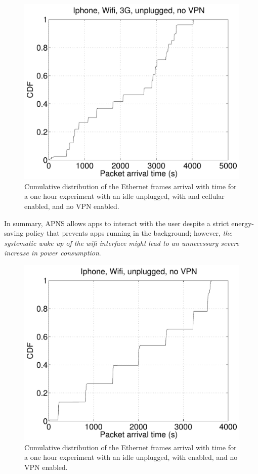 \begin{figure}
\centering
        \includegraphics[width=0.8\linewidth]{../../code/pushNotification/Fig/bw_iphone_wifi_3g_unplug_novpn_ts.pdf}
  \caption{Cumulative distribution of the Ethernet frames
          arrival with time for a one hour experiment with an idle
          \iphone{} unplugged, with \wifi{} and cellular enabled, and no VPN
          enabled.}
  \label{fig:push_w3_ts}
   \vspace{\postfigspace}
\end{figure}


In summary, APNS allows apps to interact with the user despite a strict energy-saving policy that 
prevents apps running in the background; however, \emph{the systematic wake up of
the wifi interface might lead to an unnecessary severe increase in power
consumption}. 


\begin{figure}
\centering
        \includegraphics[width=0.8\linewidth]{../../code/pushNotification/Fig/bw_iphone_wifi_unplug_novpn_ts.pdf}
  \caption{Cumulative distribution of the Ethernet frames
          arrival with time for a one hour experiment with an idle
          \iphone{} unplugged, with \wifi{} enabled, and no VPN
          enabled.}
  \label{fig:push_w_ts}
   \vspace{\postfigspace}
\end{figure}

